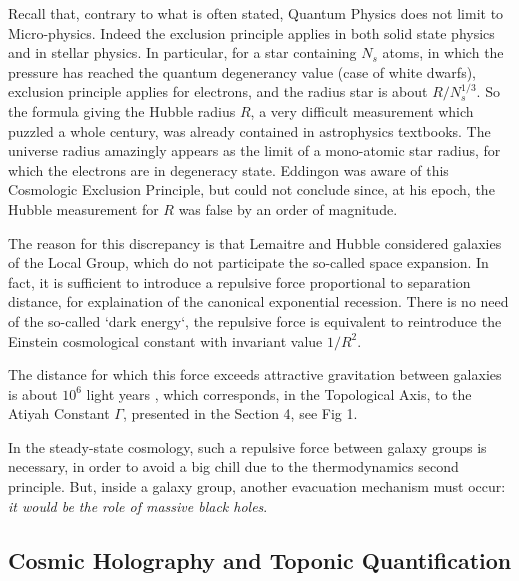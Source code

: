 \documentclass[twoside,draft]{article}
\begin{document}
\begin{sloppypar}
{Recall that, contrary to what is often stated, Quantum Physics does not limit to Micro-physics.
Indeed the exclusion principle applies in both solid state physics and in stellar physics. In particular,
for a star containing $N_s$ atoms, in which the pressure has reached the quantum degenerancy value
(case of white dwarfs), exclusion principle applies for electrons, and the radius star is about $R/N_{s}^{1/3}$.
So the formula giving the Hubble radius $R$, a very difficult measurement which puzzled a whole
century, was already contained in astrophysics textbooks. The universe radius amazingly appears as
the limit of a mono-atomic star radius, for which the electrons are in degeneracy state. Eddingon was
aware of this Cosmologic Exclusion Principle, but could not conclude since, at his epoch, the
Hubble measurement for $R$ was false by an order of magnitude.

The reason for this discrepancy is that Lemaitre and Hubble considered galaxies of the Local
Group, which do not participate the so-called space expansion. In fact, it is sufficient to introduce a
repulsive force proportional to separation distance, for explaination of the canonical
exponential recession. There is no need of the so-called `dark energy`, the repulsive force is equivalent
to reintroduce the Einstein cosmological constant with invariant value $1/R^{2}$. 

The distance for which this force exceeds attractive
gravitation between galaxies is about $10^{6}$ light years \cite{Sanchez1}, which corresponds, in the Topological
Axis, to the Atiyah Constant $\Gamma$, presented in the Section 4, see Fig 1.

In the steady-state cosmology, such a repulsive force between galaxy groups is necessary, in
order to avoid a big chill due to the thermodynamics second principle. But, inside a galaxy group,
another evacuation mechanism must occur: \textit{it would be the role of massive black holes}.

\subsection{Cosmic Holography and Toponic Quantification}

}
\end{sloppypar}
\end{document}

